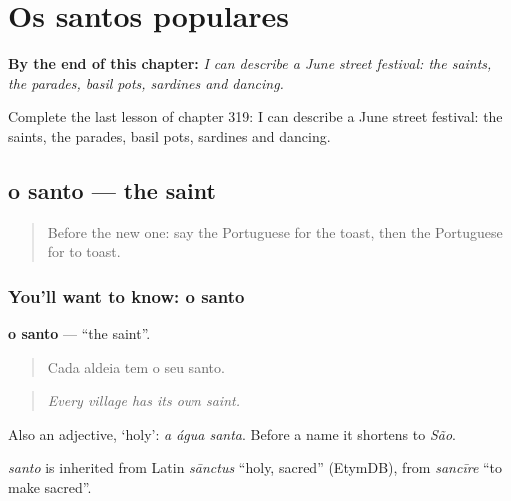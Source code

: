 
\chapter{Os santos populares}
\label{ch:pt-os-santos-populares}

\begin{chapteropening}
\textbf{By the end of this chapter:} \emph{I can describe a June street festival: the saints, the parades, basil pots, sardines and dancing.}

Complete the last lesson of chapter 319: I can describe a June street festival: the saints, the parades, basil pots, sardines and dancing.
\end{chapteropening}

\section[o santo]{o santo — the saint}

\label{lesson:PT-C319-santo}



\begin{quote}
Before the new one: say the Portuguese for the toast, then the Portuguese for to toast.
\end{quote}

\subsection*{You'll want to know: o santo}
\textbf{o santo} — \textquotedblleft{}the saint\textquotedblright{}.

\begin{quote}
Cada aldeia tem o seu santo.
\end{quote}

\begin{quote}
\emph{Every village has its own saint.}
\end{quote}

Also an adjective, ‘holy’: \emph{a água santa}. Before a name it shortens to \emph{São}.

\begin{cousinweb}
\emph{santo} is inherited from Latin \emph{sānctus} \textquotedblleft{}holy, sacred\textquotedblright{} (EtymDB), from \emph{sancīre} \textquotedblleft{}to make sacred\textquotedblright{}.
\end{cousinweb}

